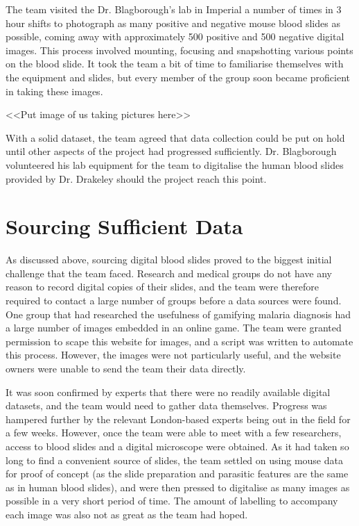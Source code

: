 \documentclass[a4paper,11pt]{article}
\begin{document}
The team visited the Dr. Blagborough's lab in Imperial a number of times in 3 hour shifts to photograph as many positive and negative mouse blood slides as possible, coming away with approximately 500 positive and 500 negative digital images. This process involved mounting, focusing and snapshotting various points on the blood slide. It took the team a bit of time to familiarise themselves with the equipment and slides, but every member of the group soon became proficient in taking these images.

<<Put image of us taking pictures here>>

With a solid dataset, the team agreed that data collection could be put on hold until other aspects of the project had progressed sufficiently. Dr. Blagborough volunteered his lab equipment for the team to digitalise the human blood slides provided by Dr. Drakeley should the project reach this point.


\section{Sourcing Sufficient Data}
As discussed above, sourcing digital blood slides proved to the biggest initial challenge that the team faced. Research and medical groups do not have any reason to record digital copies of their slides, and the team were therefore required to contact a large number of groups before a data sources were found. One group that had researched the usefulness of gamifying malaria diagnosis had a large number of images embedded in an online game. The team were granted permission to scape this website for images, and a script was written to automate this process. However, the images were not particularly useful, and the website owners were unable to send the team their data directly. 

It was soon confirmed by experts that there were no readily available digital datasets, and the team would need to gather data themselves. Progress was hampered further by the  relevant London-based experts being out in the field for a few weeks. However, once the team were able to meet with a few researchers, access to blood slides and a digital microscope were obtained. As it had taken so long to find a convenient source of slides, the team settled on using mouse data for proof of concept (as the slide preparation and parasitic features are the same as in human blood slides), and were then pressed to digitalise as many images as possible in a very short period of time. The amount of labelling to accompany each image was also not as great as the team had hoped. 
\end{document}
